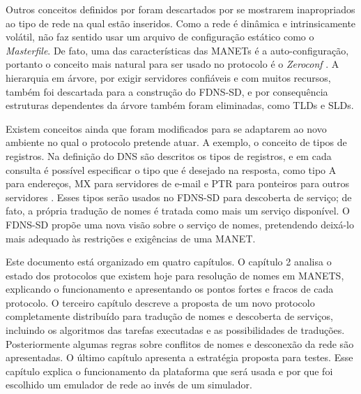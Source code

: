 Outros conceitos definidos por \cite{rfc1035} foram descartados por se mostrarem
inapropriados ao tipo de rede na qual estão inseridos. Como a rede é dinâmica e
intrinsicamente volátil, não faz sentido usar um arquivo de configuração estático
como o \textit{Masterfile}. De fato, uma das características das MANETs é a
auto-configuração, portanto o conceito mais natural para ser usado no protocolo
é o \textit{Zeroconf} \cite{zeroconf}. A hierarquia em árvore, por exigir servidores
confiáveis e com muitos recursos, também foi descartada para a construção do
FDNS-SD, e por consequência estruturas dependentes da árvore também foram eliminadas,
como TLDs e SLDs.

Existem conceitos ainda que foram modificados para se adaptarem ao novo ambiente
no qual o protocolo pretende atuar. A exemplo, o conceito de tipos de registros.
Na definição do DNS são descritos os tipos de registros, e em cada consulta é
possível especificar o tipo que é desejado na resposta, como tipo A para endereços,
MX para servidores de e-mail e PTR para ponteiros para outros servidores \cite{rfc1035}.
Esses tipos serão usados no FDNS-SD para descoberta de serviço; de
fato, a própria tradução de nomes é tratada como mais um serviço disponível. O
FDNS-SD propõe uma nova visão sobre o serviço de nomes, pretendendo deixá-lo mais
adequado às restrições e exigências de uma MANET.


Este documento está organizado em quatro capítulos. O capítulo 2 analisa o estado
dos protocolos que existem hoje para resolução de nomes em MANETS, explicando o
funcionamento e apresentando os pontos fortes e fracos de cada protocolo.
O terceiro capítulo descreve a proposta de um novo protocolo completamente
distribuído para tradução de nomes e descoberta de serviços, incluindo os
algoritmos das tarefas executadas e as possibilidades de traduções. Posteriormente
algumas regras sobre conflitos de nomes e desconexão da rede são apresentadas.
O último capítulo apresenta a estratégia proposta para testes. Esse capítulo
explica o funcionamento da plataforma que será usada e por que foi escolhido um
emulador de rede ao invés de um simulador.